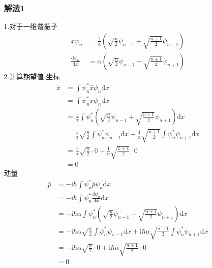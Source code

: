 \subsubsection{解法1}
1.对于一维谐振子
\begin{equation}
    \begin{aligned}
        x\psi _n&=\frac{1}{\alpha}\left( \sqrt{\frac{n}{2}}\psi _{n-1}+\sqrt{\frac{n+1}{2}}\psi _{n+1} \right) 
\\
\frac{\mathrm{d}\psi _n}{\mathrm{d}x}&=\alpha \left( \sqrt{\frac{n}{2}}\psi _{n-1}-\sqrt{\frac{n+1}{2}}\psi _{n+1} \right) 
    \end{aligned}
\end{equation}
2.计算期望值
坐标
\begin{equation}
    \begin{aligned}
        \bar{x}&=\int{\psi _{n}^{*}\hat{x}\psi _n\mathrm{d}x}
\\
&=\int{\psi _{n}^{*}x\psi _n\mathrm{d}x}
\\
&=\frac{1}{\alpha}\int{\psi _{n}^{*}\left( \sqrt{\frac{n}{2}}\psi _{n-1}+\sqrt{\frac{n+1}{2}}\psi _{n+1} \right) \mathrm{d}x}
\\
&=\frac{1}{\alpha}\sqrt{\frac{n}{2}}\int{\psi _{n}^{*}\psi _{n-1}\mathrm{d}x}+\frac{1}{\alpha}\sqrt{\frac{n+1}{2}}\int{\psi _{n}^{*}\psi _{n+1}\mathrm{d}x}
\\
&=\frac{1}{\alpha}\sqrt{\frac{n}{2}}\cdot 0+\frac{1}{\alpha}\sqrt{\frac{n+1}{2}}\cdot 0
\\
&=0
    \end{aligned}
\end{equation}
动量
\begin{equation}
    \begin{aligned}
        \bar{p}&=-\mathrm{i}\hbar \int{\psi _{n}^{*}\hat{p}\psi _n\mathrm{d}x}
\\
&=-\mathrm{i}\hbar \int{\psi _{n}^{*}\frac{\mathrm{d}\psi _n}{\mathrm{d}x}\mathrm{d}x}
\\
&=-\mathrm{i}\hbar \alpha \int{\psi _{n}^{*}\left( \sqrt{\frac{n}{2}}\psi _{n-1}-\sqrt{\frac{n+1}{2}}\psi _{n+1} \right) \mathrm{d}x}
\\
&=-\mathrm{i}\hbar \alpha \sqrt{\frac{n}{2}}\int{\psi _{n}^{*}\psi _{n-1}\mathrm{d}x}+\mathrm{i}\hbar \alpha \sqrt{\frac{n+1}{2}}\int{\psi _{n}^{*}\psi _{n+1}\mathrm{d}x}
\\
&=-\mathrm{i}\hbar \alpha \sqrt{\frac{n}{2}}\cdot 0+\mathrm{i}\hbar \alpha \sqrt{\frac{n+1}{2}}\cdot 0
\\
&=0
    \end{aligned}
\end{equation}
